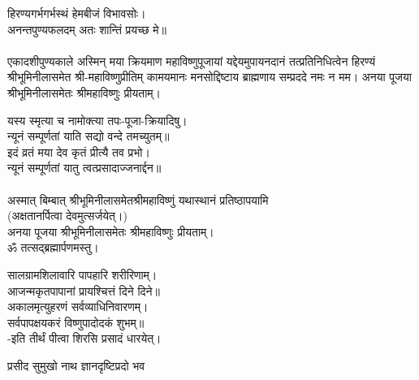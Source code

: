 हिरण्यगर्भगर्भस्थं हेमबीजं विभावसोः।\\
अनन्तपुण्यफलदम् अतः शान्तिं प्रयच्छ मे॥\\
 \\
एकादशीपुण्यकाले अस्मिन् मया क्रियमाण महाविष्णुपूजायां यद्देयमुपायनदानं तत्प्रतिनिधित्वेन हिरण्यं श्रीभूमिनीलासमेत श्री-महाविष्णुप्रीतिम् 
कामयमानः मनसोद्दिष्टाय ब्राह्मणाय सम्प्रददे नमः न मम। 
अनया पूजया श्रीभूमिनीलासमेतः श्रीमहाविष्णुः प्रीयताम्। 
 
 यस्य स्मृत्या च नामोक्त्या तपः-पूजा-क्रियादिषु।\\
न्यूनं सम्पूर्णतां याति सद्यो वन्दे तमच्युतम्॥ \\
इदं व्रतं मया देव कृतं प्रीत्यै तव प्रभो।\\
न्यूनं सम्पूर्णतां यातु त्वत्प्रसादाज्जनार्द्दन॥\\
 \\
अस्मात् बिम्बात् श्रीभूमिनीलासमेतश्रीमहाविष्णुं यथास्थानं प्रतिष्ठापयामि\\
(अक्षतानर्पित्वा देवमुत्सर्जयेत्।)\\
अनया पूजया श्रीभूमिनीलासमेतः श्रीमहाविष्णुः प्रीयताम्। \\
ॐ तत्सद्ब्रह्मार्पणमस्तु।
 
सालग्रामशिलावारि पापहारि शरीरिणाम्।\\
आजन्मकृतपापानां प्रायश्चित्तं दिने दिने॥\\
अकालमृत्युहरणं सर्वव्याधिनिवारणम्।\\
सर्वपापक्षयकरं विष्णुपादोदकं शुभम्॥ \\
 -इति तीर्थं पीत्वा शिरसि प्रसादं धारयेत्।



{प्रसीद सुमुखो नाथ ज्ञानदृष्टिप्रदो भव}
